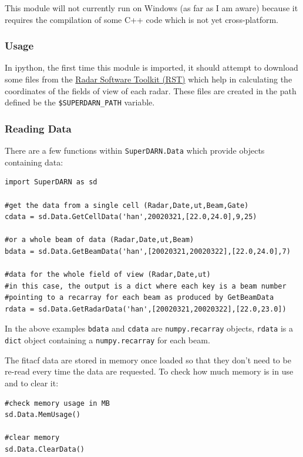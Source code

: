 			This module will not currently run on Windows (as far as I am aware) because it requires the compilation of some C++ code which is not yet cross-platform.

		\subsubsection{Usage}
		
			In ipython, the first time this module is imported, it should attempt to download some files from the \href{https://github.com/SuperDARN/rst}{Radar Software Toolkit (RST)} which help in calculating the coordinates of the fields of view of each radar. These files are created in the path defined be the \texttt{\$SUPERDARN\_PATH} variable.

			\subsubsection{Reading Data}
				There are a few functions within \texttt{SuperDARN.Data} which provide objects containing data:

				\begin{verbatim}
import SuperDARN as sd
			
#get the data from a single cell (Radar,Date,ut,Beam,Gate)
cdata = sd.Data.GetCellData('han',20020321,[22.0,24.0],9,25)
			
#or a whole beam of data (Radar,Date,ut,Beam)
bdata = sd.Data.GetBeamData('han',[20020321,20020322],[22.0,24.0],7)
			
#data for the whole field of view (Radar,Date,ut)
#in this case, the output is a dict where each key is a beam number
#pointing to a recarray for each beam as produced by GetBeamData
rdata = sd.Data.GetRadarData('han',[20020321,20020322],[22.0,23.0])
				\end{verbatim}
			
				In the above examples \texttt{bdata} and \texttt{cdata} are \texttt{numpy.recarray} objects, \texttt{rdata} is a \texttt{dict} object containing a \texttt{numpy.recarray} for each beam.
			
				The fitacf data are stored in memory once loaded so that they don't need to be re-read every time the data are requested. To check how much memory is in use and to clear it:
			
				\begin{verbatim}
#check memory usage in MB
sd.Data.MemUsage()
		
#clear memory
sd.Data.ClearData()
				\end{verbatim}
			
